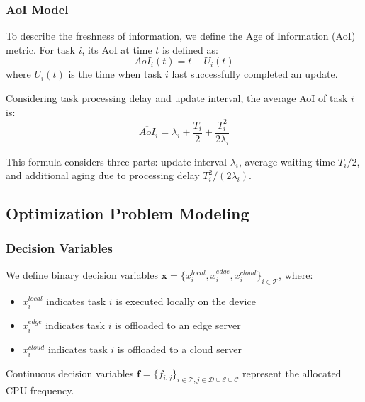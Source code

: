 \documentclass[conference]{IEEEtran}
\begin{document}
\subsubsection{AoI Model}
To describe the freshness of information, we define the Age of Information (AoI) metric. For task $i$, its AoI at time $t$ is defined as:
\begin{equation}
AoI_i(t) = t - U_i(t)
\end{equation}
where $U_i(t)$ is the time when task $i$ last successfully completed an update.

Considering task processing delay and update interval, the average AoI of task $i$ is:
\begin{equation}
\overline{AoI}_i = \lambda_i + \frac{T_i}{2} + \frac{T_i^2}{2\lambda_i}
\end{equation}

This formula considers three parts: update interval $\lambda_i$, average waiting time $T_i/2$, and additional aging due to processing delay $T_i^2/(2\lambda_i)$.

\subsection{Optimization Problem Modeling}
\subsubsection{Decision Variables}
We define binary decision variables $\mathbf{x} = \{x_i^{local}, x_i^{edge}, x_i^{cloud}\}_{i \in \mathcal{T}}$, where:
\begin{itemize}
    \item $x_{i}^{local}$ indicates task $i$ is executed locally on the device
    \item $x_{i}^{edge}$ indicates task $i$ is offloaded to an edge server
    \item $x_{i}^{cloud}$ indicates task $i$ is offloaded to a cloud server
\end{itemize}
Continuous decision variables $\mathbf{f} = \{f_{i,j}\}_{i \in \mathcal{T}, j \in \mathcal{D} \cup \mathcal{E} \cup \mathcal{C}}$ represent the allocated CPU frequency.
\end{document}
